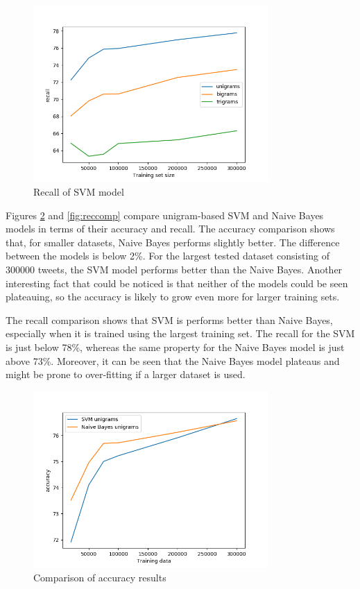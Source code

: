 \begin{figure}[ht]
    \centering
    \includegraphics[width=0.8\textwidth]{SVMrec}
    \caption{Recall of SVM model}
    \label{fig:svmrec}
\end{figure}

Figures \ref{fig:acccomp} and \ref{fig:reccomp} compare unigram-based SVM and Naive Bayes models in terms of their accuracy and recall. The accuracy comparison shows that, for smaller datasets, Naive Bayes performs slightly better. The difference between the models is below 2\%. For the largest tested dataset consisting of 300000 tweets, the SVM model performs better than the Naive Bayes. Another interesting fact that could be noticed is that neither of the models could be seen plateauing, so the accuracy is likely to grow even more for larger training sets.

The recall comparison shows that SVM is performs better than Naive Bayes, especially when it is trained using the largest training set. The recall for the SVM is just below 78\%, whereas the same property for the Naive Bayes model is just above 73\%. Moreover, it can be seen that the Naive Bayes model plateaus and might be prone to over-fitting if a larger dataset is used.

\begin{figure}[ht]
    \centering
    \includegraphics[width=0.8\textwidth]{classACCComp}
    \caption{Comparison of accuracy results}
    \label{fig:acccomp}
\end{figure}

